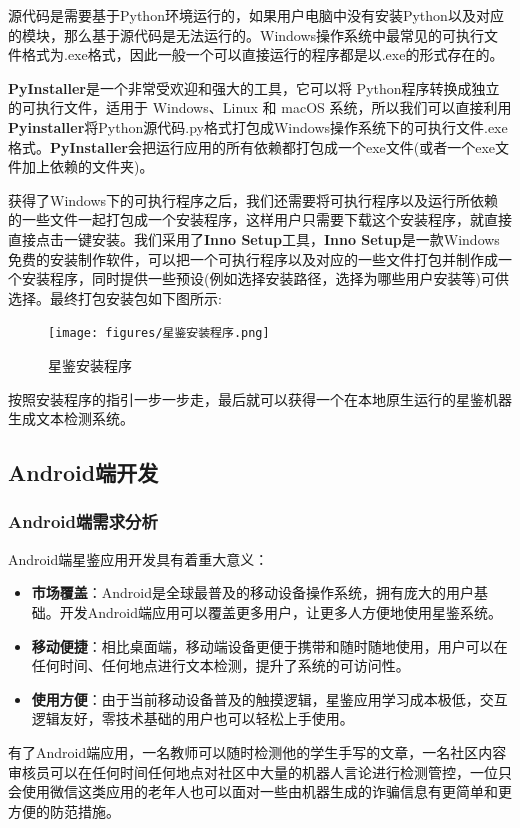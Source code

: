 \documentclass[a4paper]{report}
\begin{document}
源代码是需要基于Python环境运行的，如果用户电脑中没有安装Python以及对应的模块，那么基于源代码是无法运行的。Windows操作系统中最常见的可执行文件格式为.exe格式，因此一般一个可以直接运行的程序都是以.exe的形式存在的。

\textbf{PyInstaller}是一个非常受欢迎和强大的工具，它可以将 Python程序转换成独立的可执行文件，适用于 Windows、Linux 和 macOS 系统，所以我们可以直接利用\textbf{Pyinstaller}将Python源代码.py格式打包成Windows操作系统下的可执行文件.exe格式。\textbf{PyInstaller}会把运行应用的所有依赖都打包成一个exe文件(或者一个exe文件加上依赖的文件夹)。

获得了Windows下的可执行程序之后，我们还需要将可执行程序以及运行所依赖的一些文件一起打包成一个安装程序，这样用户只需要下载这个安装程序，就直接直接点击一键安装。我们采用了\textbf{Inno Setup}工具，\textbf{Inno Setup}是一款Windows免费的安装制作软件，可以把一个可执行程序以及对应的一些文件打包并制作成一个安装程序，同时提供一些预设(例如选择安装路径，选择为哪些用户安装等)可供选择。最终打包安装包如下图所示:
\begin{figure}[H]
	\centering
	\texttt{[image: figures/星鉴安装程序.png]}
	\caption{星鉴安装程序}
\end{figure}
按照安装程序的指引一步一步走，最后就可以获得一个在本地原生运行的星鉴机器生成文本检测系统。
\subsection{Android端开发}
\subsubsection{Android端需求分析}
Android端星鉴应用开发具有着重大意义：
\begin{itemize}
	\item \textbf{市场覆盖}：Android是全球最普及的移动设备操作系统，拥有庞大的用户基础。开发Android端应用可以覆盖更多用户，让更多人方便地使用星鉴系统。
	\item \textbf{移动便捷}：相比桌面端，移动端设备更便于携带和随时随地使用，用户可以在任何时间、任何地点进行文本检测，提升了系统的可访问性。
	\item \textbf{使用方便}：由于当前移动设备普及的触摸逻辑，星鉴应用学习成本极低，交互逻辑友好，零技术基础的用户也可以轻松上手使用。
\end{itemize}

有了Android端应用，一名教师可以随时检测他的学生手写的文章，一名社区内容审核员可以在任何时间任何地点对社区中大量的机器人言论进行检测管控，一位只会使用微信这类应用的老年人也可以面对一些由机器生成的诈骗信息有更简单和更方便的防范措施。
\end{document}
